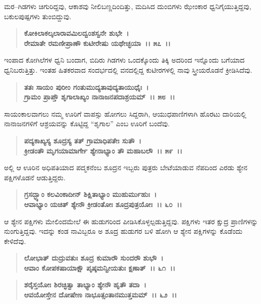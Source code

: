 ಮರ–ಗಿಡಗಳು ಚಿಗುರಿದ್ದವು, ಆಕಾಶವು ನೀಲಿಬಣ್ಣದಿಂದಿತ್ತು, ಮದಿಸಿದ ದುಂಬಿಗಳು ಝೇಂಕಾರ ಧ್ವನಿಗೈಯುತ್ತಿದ್ದವು, ಬಕುಲಪುಷ್ಪಗಳು ತುಂಬಿದ್ದುವು.

\begin{verse}
\textbf{ಕೋಕಿಲಾಕಲ್ಕಲಾರಾವಮಿಲದ್ವಂಶಸ್ವನೇ ಶುಭೇ~।}\\\textbf{ರೇಮಾತೇ ರಮಣೀಪ್ರಾಣೌ ಕುಟೀರೇಷು ಯಥೇಚ್ಛಯಾ~।। ೫೭~।। }
\end{verse}

ಇಂಪಾದ ಕೋಗಿಲೆಗಳ ಧ್ವನಿ ಬಂದಾಗ, ಬಿದಿರು ಗಿಡಗಳು ಒಂದಕ್ಕೊಂದು ತಿಕ್ಕಿ ಅದರಿಂದ ಇನ್ನೊಂದು ಬಗೆಯಾದ ಧ್ವನಿಬರುತ್ತಿತ್ತು. ಇಂತಹ ಹಿತಕರವಾದ ಸಂದರ್ಭದಲ್ಲಿ ವನದಲ್ಲಿದ್ದ ಕುಟೀರಗಳಲ್ಲಿ ನಾವು ಸ್ತ್ರೀಯರೊಡನೆ ಕ್ರೀಡಿಸಿದೆವು.

\begin{verse}
\textbf{ತತಃ ಸಾಯಂ ಪುರೀಂ ಗಂತುಮುದ್ಯತಾವುದ್ಯತಾಯುಧೈಃ~।}\\\textbf{ಗ್ರಾಮಂ ಪ್ರಾಪ್ತೌ ಶೃಗಾಲಾಖ್ಯಂ ನಾನಾಜನಪದಾಶ್ರಯಮ್~।। ೫೮~।। }
\end{verse}

ಸಾಯಂಕಾಲವಾಗಲು ನಮ್ಮ ಊರಿಗೆ ವಾಪಸ್ಸು ಹೋಗಲು ಸಿದ್ದರಾಗಿ, ಆಯುಧಪಾಣಿಗಳಾಗಿ ಹೊರಟು ದಾರಿಯಲ್ಲಿ ನಾನಾಜನಗಳಿಗೆ ಆಶ್ರಯವನ್ನು ಕೊಟ್ಟಿದ್ದ “ಶೃಗಾಲ” ಎಂಬ ಊರಿಗೆ ಬಂದೆವು.

\begin{verse}
\textbf{ಪದ್ಯಕಾಖ್ಯಸ್ಯ ಶೂದ್ರಸ್ಯ ತತ್ ಗ್ರಾಮಾಧಿಪತೇಃ ಸುತೌ~।}\\\textbf{ಕ್ರೀಡಂತೌ ಮೃಗಯಾಮಾರ್ಗೇ ಶ್ಯೇನಾಭ್ಯಾಂ ತೌ ಮಹಾಬಲೌ~।। ೫೯~।।}
\end{verse}

ಅಲ್ಲಿ ಆ ಊರಿನ ಅಧಿಪತಿಯಾದ ಪದ್ಮಕನೆಂಬ ಶೂದ್ರನ ಇಬ್ಬರು ಪುತ್ರರು ಬೇಟೆಯಾಡುವ ನೆಪದಿಂದ ಎರಡು ಶ್ಯೇನ ಪಕ್ಷಿಗಳೊಡನೆ ಆಡುತ್ತಿದ್ದರು.

\begin{verse}
\textbf{ಗ್ರಸದ್ಭ್ಯಾಂ ಕಲವಿಂಕಾದೀನ್ ಶಿಕ್ಷಿತಾಭ್ಯಾಂ ಮುಹುರ್ಮುಹುಃ~।}\\\textbf{ಆವಾಭ್ಯಾಂ ಯಚಿತ್ ಶ್ಯೇನೌ ಕ್ರೀಡಂತೋಃ ಶೂದ್ರಪುತ್ರಯೋಃ~।। ೬೦~।।}
\end{verse}

ಆ ಶ್ಯೇನ ಪಕ್ಷಿಗಳು ಮೇಲಿಂದಮೇಲೆ ಈ ಹುಡುಗರಿಂದ ಪೀಡಿಸಿಕೊಳ್ಳಲ್ಪಡುತ್ತಿದ್ದವು. ಪಕ್ಷಿಗಳು ಇತರ ಕ್ಷುದ್ರ ಪ್ರಾಣಿಗಳನ್ನು ನುಂಗುತ್ತಿದ್ದವು. ಇದನ್ನು ಕಂಡ ನಾವಿಬ್ಬರೂ ಅ ಶೂದ್ರ ಹುಡುಗರ ಬಳಿ ಹೋಗಿ ಆ ಶ್ಯೇನ ಪಕ್ಷಿಗಳನ್ನು ಕೊಡೆಂದು ಕೇಳಿದೆವು.

\begin{verse}
\textbf{ಲೋಭಾತ್ ದುದ್ರುವತುಃ ಶೂದ್ರ ಕುಮಾರೌ ಸುಂದರೌ ಶುಭೌ~।}\\\textbf{ಆವಾಂ ಕೋಪಕಷಾಯಾಕ್ಷೌ ಪೃಷ್ಠಮನ್ವೀಯತುಃ ಕ್ಷಣಾತ್~।। ೬೧~।।} 
\end{verse}

\begin{verse}
\textbf{ಶರೈಸ್ತಯೋಃ ಶಿರಚ್ಛಿತ್ವಾ ತಾಭ್ಯಾಂ ಶ್ಯೇನೌ ಹೃತೌ ತದಾ~।}\\\textbf{ಆವಯೋಸ್ತೇನ ದೋಷೇಣ ನಾಭೂತ್ಸಂತಾನಮುತ್ತಮಮ್~।। ೬೨~।।}
\end{verse}

